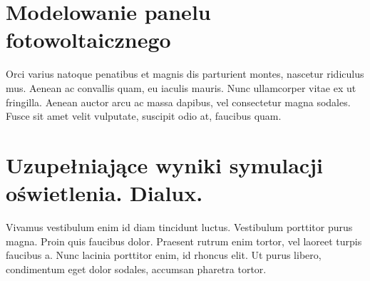 \documentclass[skorowidz,xodstep,magisterska]{dyplomWIZUTMJ}
\begin{document}
\section{Modelowanie panelu fotowoltaicznego }
	Orci varius natoque penatibus et magnis dis parturient montes, nascetur ridiculus mus. Aenean ac convallis quam, eu iaculis mauris. Nunc ullamcorper vitae ex ut fringilla. Aenean auctor arcu ac massa dapibus, vel consectetur magna sodales. Fusce sit amet velit vulputate, suscipit odio at, faucibus quam.
\section{Uzupełniające wyniki symulacji oświetlenia. Dialux.}
	Vivamus vestibulum enim id diam tincidunt luctus. Vestibulum porttitor purus magna. Proin quis faucibus dolor. Praesent rutrum enim tortor, vel laoreet turpis faucibus a. Nunc lacinia porttitor enim, id rhoncus elit. Ut purus libero, condimentum eget dolor sodales, accumsan pharetra tortor.




{}








\listoftables %

\listoffigures

%
\printindex
\end{document}
